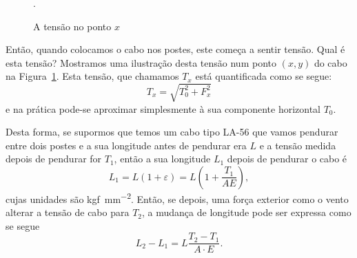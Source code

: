 \begin{figure}
  \vspace{-0.7cm}
  \begin{figurebox}
    \centering
    \caption{A tensão no ponto $x$}.
    \label{fig:5}
  \end{figurebox}
   \vspace{-0.5cm}
\end{figure}

Então, quando colocamos o cabo nos postes, este começa a sentir
tensão. Qual é esta tensão? Mostramos uma ilustração desta tensão num
ponto $(x,y)$ do cabo na Figura~\ref{fig:5}. Esta tensão, que chamamos
$T_x$ está quantificada como se segue:
\begin{displaymath}
  T_x=\sqrt{T_0^2+F_x^2}
\end{displaymath}
e na prática pode-se aproximar simplesmente à sua componente horizontal $T_0$.

Desta forma, se supormos que temos um cabo tipo LA-56 que vamos
pendurar entre dois postes e a sua longitude antes de pendurar era $L$
e a tensão medida depois de pendurar for $T_1$, então a sua longitude
$L_1$ depois de pendurar o cabo é
\begin{displaymath}
  L_1 = L(1+\varepsilon)=L\left(1+\frac{T_1}{AE}\right),
\end{displaymath}
cujas unidades são \si{kgf\per mm^2}.
Então, se depois, uma força exterior como o vento alterar a tensão de
cabo para $T_2$, a mudança de longitude pode ser expressa como se
segue
\begin{equation}
 \label{eq:20}
 L_2-L_1=L\frac{T_2-T_1}{A\cdot E}.
\end{equation}

